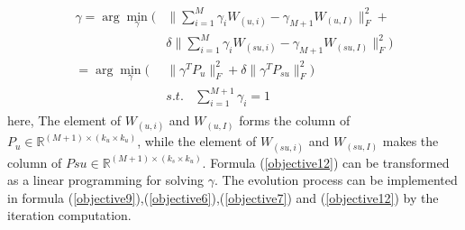 \documentclass[review]{elsarticle}
\begin{document}
 \begin{align}
\label{objective12}
\begin{aligned}
\gamma=\arg \min_{\gamma}(&\|\sum^{M}_{i=1}\gamma_{i} W_{(u,i)}- \gamma_{M+1}W_{(u,I)}\|^{2}_{F}+\\
&\delta\|\sum^{M}_{i=1}\gamma_{i}W_{(su,i)}-\gamma_{M+1} W_{(su,I)}\|^{2}_{F})\\
=\arg \min_{\gamma}(&\|\gamma^{T}P_{u}\|^{2}_{F}+\delta\|\gamma^{T}P_{su}\|^{2}_{F})\\
&s.t.~~~~\sum^{M+1}_{i=1}\gamma_{i}=1
 \end{aligned}
\end{align}
here, The element of $W_{(u,i)}$ and $W_{(u,I)}$ forms the column of $P_{u}\in \mathbb{R}^{(M+1)\times (k_{u}\times k_{u})}$, while the element of $W_{(su,i)}$ and $W_{(su,I)}$ makes the column of $P{su}\in \mathbb{R}^{(M+1)\times (k_{s}\times k_{u})}$.
Formula (\ref{objective12}) can be transformed as a linear programming for solving $\gamma$. The evolution process can be implemented in formula (\ref{objective9}),(\ref{objective6}),(\ref{objective7}) and (\ref{objective12}) by the iteration computation.
\end{document}
